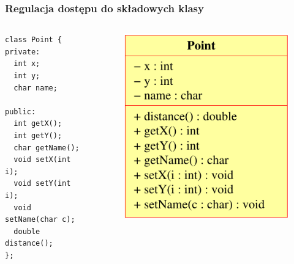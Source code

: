 \documentclass{beamer}
\begin{document}
\begin{frame}[fragile]
\frametitle{Regulacja dostępu do składowych klasy}

\begin{columns}
\begin{lstlisting}
class Point {
private:
  int x;
  int y;
  char name;

public:
  int getX();
  int getY();
  char getName();
  void setX(int i);
  void setY(int i);
  void setName(char c);
  double distance();
};
\end{lstlisting}


\begin{figure}[!htb]
\centerline{\includegraphics[scale=0.7]{point2}}
\end{figure}
\end{columns}
\end{frame}

\end{document}

